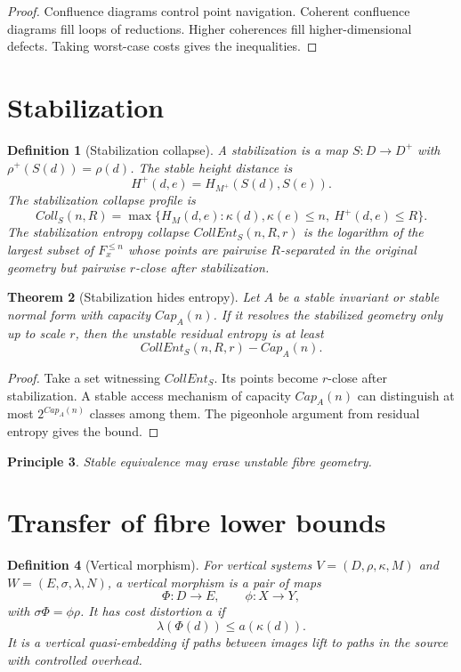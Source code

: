 \documentclass[11pt]{article}
\newtheorem{theorem}{Theorem}[section]
\newtheorem{definition}[theorem]{Definition}
\newtheorem{principle}[theorem]{Principle}
\begin{document}
\begin{proof}
Confluence diagrams control point navigation.  Coherent confluence diagrams fill loops of reductions.  Higher coherences fill higher-dimensional defects.  Taking worst-case costs gives the inequalities.
\end{proof}

\section{Stabilization}

\begin{definition}[Stabilization collapse]
A stabilization is a map \(S:D\to D^+\) with \(\rho^+(S(d))=\rho(d)\).  The stable height distance is
\[
H^+(d,e)=H_{M^+}(S(d),S(e)).
\]
The stabilization collapse profile is
\[
Coll_S(n,R)=
\max\{H_M(d,e):\kappa(d),\kappa(e)\le n,\ H^+(d,e)\le R\}.
\]
The stabilization entropy collapse \(CollEnt_S(n,R,r)\) is the logarithm of the largest subset of \(F_x^{\le n}\) whose points are pairwise \(R\)-separated in the original geometry but pairwise \(r\)-close after stabilization.
\end{definition}

\begin{theorem}[Stabilization hides entropy]
Let \(A\) be a stable invariant or stable normal form with capacity \(Cap_A(n)\).  If it resolves the stabilized geometry only up to scale \(r\), then the unstable residual entropy is at least
\[
CollEnt_S(n,R,r)-Cap_A(n).
\]
\end{theorem}

\begin{proof}
Take a set witnessing \(CollEnt_S\).  Its points become \(r\)-close after stabilization.  A stable access mechanism of capacity \(Cap_A(n)\) can distinguish at most \(2^{Cap_A(n)}\) classes among them.  The pigeonhole argument from residual entropy gives the bound.
\end{proof}

\begin{principle}
Stable equivalence may erase unstable fibre geometry.
\end{principle}

\section{Transfer of fibre lower bounds}

\begin{definition}[Vertical morphism]
For vertical systems \(V=(D,\rho,\kappa,M)\) and \(W=(E,\sigma,\lambda,N)\), a vertical morphism is a pair of maps
\[
\Phi:D\to E,\qquad \phi:X\to Y,
\]
with \(\sigma\Phi=\phi\rho\).  It has cost distortion \(a\) if
\[
\lambda(\Phi(d))\le a(\kappa(d)).
\]
It is a vertical quasi-embedding if paths between images lift to paths in the source with controlled overhead.
\end{definition}
\end{document}
